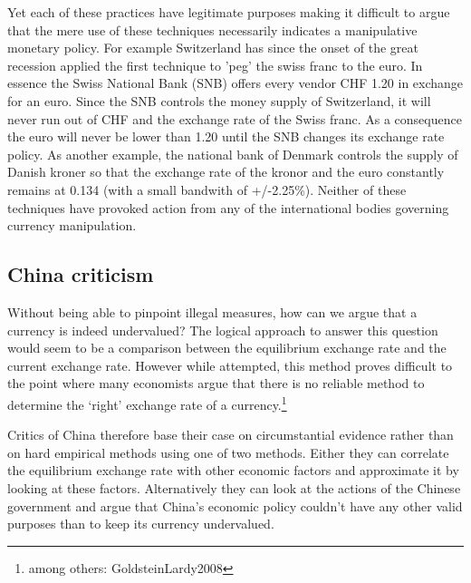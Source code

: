 \documentclass[11pt]{article}
\begin{document}
Yet each of these practices have legitimate purposes making it difficult 
to argue that the mere use of these techniques necessarily indicates a 
manipulative monetary policy. For example Switzerland has since the 
onset of the great recession applied the first technique to 'peg' the 
swiss franc to the euro. In essence the Swiss National Bank (SNB) offers 
every vendor CHF 1.20 in exchange for an euro. Since the SNB controls 
the money supply of Switzerland, it will never run out of CHF and the 
exchange rate of the Swiss franc. As a consequence the euro will never 
be lower than 1.20 until the SNB changes its exchange rate policy.  As 
another example, the national bank of Denmark controls the supply of 
Danish kroner so that the exchange rate of the kronor and the euro 
constantly remains at 0.134 (with a small bandwith of +/-2.25\%).  
Neither of these techniques have provoked action from any of the 
international bodies governing currency manipulation.



\subsection{China criticism}

Without being able to pinpoint illegal measures, how can we argue that a 
currency is indeed undervalued? The logical approach to answer this 
question would seem to be a comparison between the equilibrium exchange 
rate and the current exchange rate. However while attempted, this method 
proves difficult to the point where many economists argue that there is 
no reliable method to determine the `right' exchange rate of a 
currency.\footnote{among others: \cite{pp.  4}{GoldsteinLardy2008}}

Critics of China therefore base their case on circumstantial evidence 
rather than on hard empirical methods using one of two methods. Either 
they can correlate the equilibrium exchange rate with other economic 
factors and approximate it by looking at these factors. Alternatively 
they can look at the actions of the Chinese government and argue that 
China's economic policy couldn't have any other valid purposes than to 
keep its currency undervalued.
\end{document}
